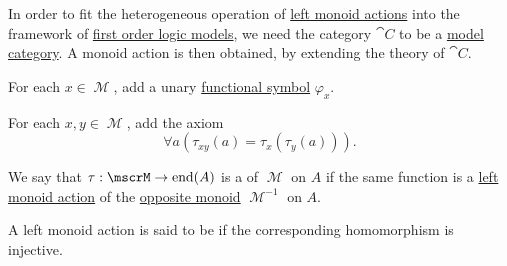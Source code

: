 \begin{remark}\label{rem:theory_of_left_monoid_actions}
  In order to fit the heterogeneous operation of \hyperref[def:left_monoid_action]{left monoid actions} into the framework of \hyperref[def:first_order_semantics/satisfiability]{first order logic models}, we need the category \( \cat{C} \) to be a \hyperref[def:first_order_model_category]{model category}. A monoid action is then obtained, by extending the theory of \( \cat{C} \).

  \begin{remenum}
     For each \( x \in \mscrM \), add a unary \hyperref[def:first_order_language/func]{functional symbol} \( \varphi_x \).

     For each \( x, y \in \mscrM \), add the axiom
    \begin{equation}\label{eq:rem:theory_of_left_monoid_actions/axiom_schema}
      \forall a (\tau_{xy}(a) = \tau_x(\tau_y(a))).
    \end{equation}
  \end{remenum}
\end{remark}

\begin{definition}\label{def:right_monoid_action}
  We say that \( \tau: \mscrM \to \End(A) \) is a  of \( \mscrM \) on \( A \) if the same function is a \hyperref[def:left_monoid_action]{left monoid action} of the \hyperref[def:magma/opposite]{opposite monoid} \( \mscrM^{-1} \) on \( A \).
\end{definition}

\begin{definition}\label{def:faithful_left_monoid_action}
  A left monoid action is said to be  if the corresponding homomorphism is injective.
\end{definition}

